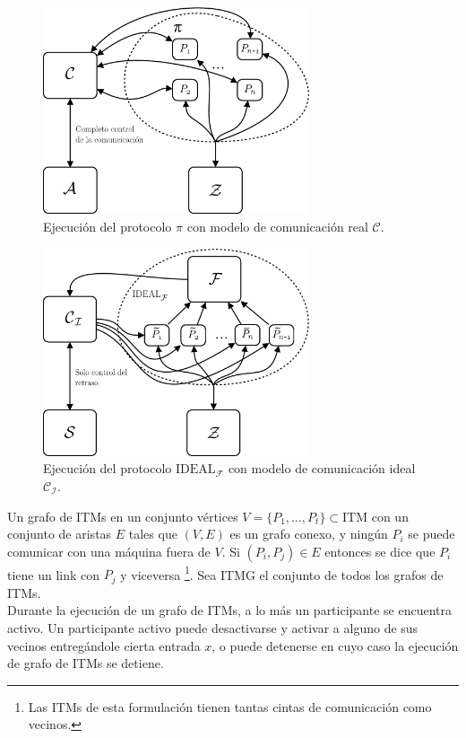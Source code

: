 \begin{figure}[hp]
    \centering
    \includegraphics[width=0.7\textwidth]{figs/mundo_real_wik}
    \caption{Ejecución del protocolo $\pi$ con modelo de comunicación real $\mathcal{C}$.}
    \label{fig:real_wik}
\end{figure}

\begin{figure}[hp]
    \centering
    \includegraphics[width=0.7\textwidth]{figs/mundo_irreal_wik}
    \caption{Ejecución del protocolo $\textrm{IDEAL}_\mathcal{F}$ con modelo de comunicación ideal $\mathcal{C_I}$.}
    \label{fig:ideal_wik}
\end{figure}

\begin{definicion}
Un grafo de ITMs en un conjunto vértices $V = \{P_1, \ldots, P_t\} \subset \textrm{ITM}$ con un conjunto
de aristas $E$ tales que $(V, E)$ es un grafo conexo, y ningún $P_i$ se puede comunicar con una máquina
fuera de $V$. Si $(P_i, P_j)\in E$ entonces se dice que $P_i$ tiene un link con $P_j$ y viceversa
\footnote{Las ITMs de esta formulación tienen tantas cintas de comunicación como vecinos.}.
Sea ITMG el conjunto de todos los grafos de ITMs.\\
Durante la ejecución de un grafo de ITMs, a lo más un participante se encuentra activo. Un participante
activo puede desactivarse y activar a alguno de sus vecinos entregándole cierta entrada $x$, o puede
detenerse en cuyo caso la ejecución de grafo de ITMs se detiene.
\end{definicion}

